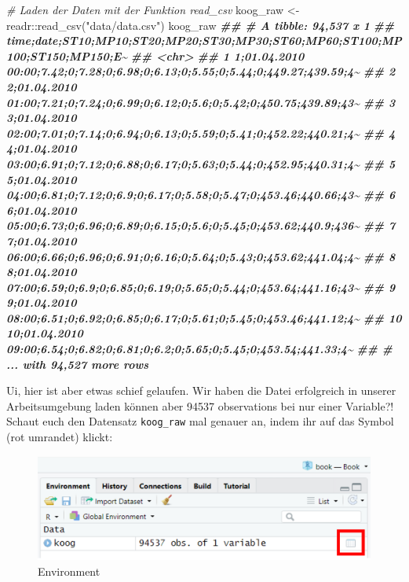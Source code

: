 \documentclass[
]{article}
\newenvironment{Shaded}{\begin{snugshade}}{\end{snugshade}}
\newcommand{\CommentTok}[1]{\textcolor[rgb]{0.56,0.35,0.01}{\textit{#1}}}
\newcommand{\DocumentationTok}[1]{\textcolor[rgb]{0.56,0.35,0.01}{\textbf{\textit{#1}}}}
\newcommand{\FunctionTok}[1]{\textcolor[rgb]{0.00,0.00,0.00}{#1}}
\newcommand{\NormalTok}[1]{#1}
\newcommand{\OtherTok}[1]{\textcolor[rgb]{0.56,0.35,0.01}{#1}}
\newcommand{\SpecialCharTok}[1]{\textcolor[rgb]{0.00,0.00,0.00}{#1}}
\newcommand{\StringTok}[1]{\textcolor[rgb]{0.31,0.60,0.02}{#1}}
\begin{document}
\begin{Shaded}
\begin{Highlighting}[]
\CommentTok{\# Laden der Daten mit der Funktion read\_csv}
\NormalTok{koog\_raw }\OtherTok{\textless{}{-}}\NormalTok{ readr}\SpecialCharTok{::}\FunctionTok{read\_csv}\NormalTok{(}\StringTok{"data/data.csv"}\NormalTok{)}
\NormalTok{koog\_raw}
\DocumentationTok{\#\# \# A tibble: 94,537 x 1}
\DocumentationTok{\#\#    \textasciigrave{}time;date;ST10;MP10;ST20;MP20;ST30;MP30;ST60;MP60;ST100;MP100;ST150;MP150;E\textasciitilde{}}
\DocumentationTok{\#\#    \textless{}chr\textgreater{}                                                                        }
\DocumentationTok{\#\#  1 1;01.04.2010 00:00;7.42;0;7.28;0;6.98;0;6.13;0;5.55;0;5.44;0;449.27;439.59;4\textasciitilde{}}
\DocumentationTok{\#\#  2 2;01.04.2010 01:00;7.21;0;7.24;0;6.99;0;6.12;0;5.6;0;5.42;0;450.75;439.89;43\textasciitilde{}}
\DocumentationTok{\#\#  3 3;01.04.2010 02:00;7.01;0;7.14;0;6.94;0;6.13;0;5.59;0;5.41;0;452.22;440.21;4\textasciitilde{}}
\DocumentationTok{\#\#  4 4;01.04.2010 03:00;6.91;0;7.12;0;6.88;0;6.17;0;5.63;0;5.44;0;452.95;440.31;4\textasciitilde{}}
\DocumentationTok{\#\#  5 5;01.04.2010 04:00;6.81;0;7.12;0;6.9;0;6.17;0;5.58;0;5.47;0;453.46;440.66;43\textasciitilde{}}
\DocumentationTok{\#\#  6 6;01.04.2010 05:00;6.73;0;6.96;0;6.89;0;6.15;0;5.6;0;5.45;0;453.62;440.9;436\textasciitilde{}}
\DocumentationTok{\#\#  7 7;01.04.2010 06:00;6.66;0;6.96;0;6.91;0;6.16;0;5.64;0;5.43;0;453.62;441.04;4\textasciitilde{}}
\DocumentationTok{\#\#  8 8;01.04.2010 07:00;6.59;0;6.9;0;6.85;0;6.19;0;5.65;0;5.44;0;453.64;441.16;43\textasciitilde{}}
\DocumentationTok{\#\#  9 9;01.04.2010 08:00;6.51;0;6.92;0;6.85;0;6.17;0;5.61;0;5.45;0;453.46;441.12;4\textasciitilde{}}
\DocumentationTok{\#\# 10 10;01.04.2010 09:00;6.54;0;6.82;0;6.81;0;6.2;0;5.65;0;5.45;0;453.54;441.33;4\textasciitilde{}}
\DocumentationTok{\#\# \# ... with 94,527 more rows}
\end{Highlighting}
\end{Shaded}

Ui, hier ist aber etwas schief gelaufen. Wir haben die Datei erfolgreich in unserer Arbeitsumgebung laden können aber 94537 observations bei nur einer Variable?! Schaut euch den Datensatz \texttt{koog\_raw} mal genauer an, indem ihr auf das Symbol (rot umrandet) klickt:

\begin{figure}

{\centering \includegraphics[width=13.58in]{images/031} 

}

\caption{Environment}\label{fig:unnamed-chunk-106}
\end{figure}
\end{document}
